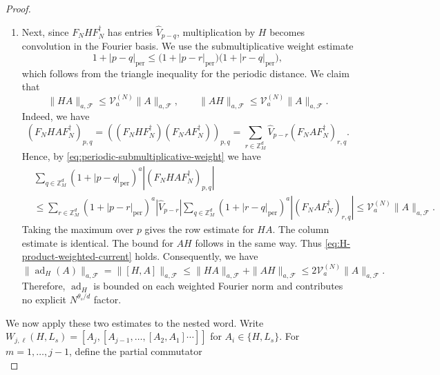 \documentclass[10pt,reqno]{article}
\numberwithin{equation}{section}
\theoremstyle{plain}
\theoremstyle{definition}
\begin{document}
\begin{proof}
\begin{enumerate}
\item Next, since $F_NHF_N^\dagger$ has entries $\widehat V_{p-q}$, multiplication by $H$ becomes convolution in the Fourier basis. We use the submultiplicative weight estimate
\begin{equation}\label{eq:periodic-submultiplicative-weight}
1+|p-q|_{\operatorname{per}} \leq \bigl(1+|p-r|_{\operatorname{per}}\bigr) \bigl(1+|r-q|_{\operatorname{per}}\bigr),
\end{equation}
which follows from the triangle inequality for the periodic distance. We claim that
\begin{equation}\label{eq:H-product-weighted-current}
\|HA\|_{a,\mathcal F} \leq \mathcal V_a^{(N)}\|A\|_{a,\mathcal F}, \qquad \|AH\|_{a,\mathcal F} \leq \mathcal V_a^{(N)}\|A\|_{a,\mathcal F}.
\end{equation}
Indeed, we have
\begin{equation}
(F_NHAF_N^\dagger)_{p,q} = ((F_NHF_N^\dagger) (F_N AF_N^\dagger))_{p,q} = \sum_{r\in\mathbb Z_M^d}  \widehat V_{p-r}(F_NAF_N^\dagger)_{r,q}.
\end{equation}
Hence, by \cref{eq:periodic-submultiplicative-weight} we have
\begin{align}
&\sum_{q\in\mathbb Z_M^d} (1+|p-q|_{\operatorname{per}})^a |(F_NHAF_N^\dagger)_{p,q} | \\ &\leq \sum_{r\in\mathbb Z_M^d} (1+|p-r|_{\operatorname{per}})^a|\widehat V_{p-r}| \sum_{q\in\mathbb Z_M^d} (1+|r-q|_{\operatorname{per}})^a |(F_NAF_N^\dagger)_{r,q} | \leq \mathcal V_a^{(N)}\|A\|_{a,\mathcal F}.
\end{align}
Taking the maximum over $p$ gives the row estimate for $HA$. The column estimate is identical. The bound for $AH$ follows in the same way. Thus \cref{eq:H-product-weighted-current} holds. Consequently, we have
\begin{equation}\label{eq:H-weighted-bound-current}
\|\operatorname{ad}_{H}(A)\|_{a,\mathcal F} = \|[H,A]\|_{a,\mathcal F} \leq \|HA\|_{a,\mathcal F}+\|AH\|_{a,\mathcal F} \leq 2\mathcal V_a^{(N)}\|A\|_{a,\mathcal F}.
\end{equation}
Therefore, $\operatorname{ad}_H$ is bounded on each weighted Fourier norm and contributes no explicit $N^{\theta_s/d}$ factor.
\end{enumerate}
We now apply these two estimates to the nested word. Write $W_{j,\ell}(H,L_s) = [A_j,[A_{j-1},\dots,[A_2,A_1]\cdots]]$ for $A_i\in\{H,L_s\}$. For \(m=1,\dots,j-1\), define the partial commutator
\begin{equation}\label{eq:partial-word-def}

\end{equation}
\end{proof}
\end{document}
